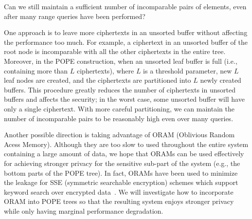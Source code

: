 \begin{question}
Can we still maintain a sufficient number of incomparable pairs of elements, even after
  many range queries have been performed?  
\end{question}

One approach is to leave more ciphertexts in an unsorted buffer without
affecting the performance too much. For example, a ciphertext in an unsorted
buffer of the root node is incomparable with all the other ciphertexts in the
entire tree.  Moreover, in the POPE construction, when an unsorted leaf buffer
is full (i.e.,  containing more than $L$ ciphertexts), where $L$ is a threshold
parameter, new $L$ leaf nodes are created, and the ciphertexts are partitioned
into $L$ newly created buffers. This procedure greatly reduces the number of
ciphertexts in unsorted buffers and affects the security; in the worst case,
some unsorted buffer will have only a single ciphertext. With more careful
partitioning, we can maintain the number of incomparable pairs to be reasonably
high even over many queries. 


Another possible direction is taking advantage of ORAM (Oblivious Random Acess
Memory). Although they are too slow to used throughout the entire system
containing a large amount of data, we hope that ORAMs can be used effectively
for achieving stronger privacy for the sensitive sub-part of the system (e.g.,
the bottom parts of the POPE tree).  In fact, ORAMs have been used to minimize
the leakage for SSE (symmetric searchable encryption) schemes which support
keyword search over encrypted data~\cite{NDSS:StePapShi14,C:GarMohPap16,RSA:IKLO16}. We will investigate how to incorporate ORAM into POPE trees so that the resulting system enjoys stronger privacy while only
having marginal performance degradation.  



